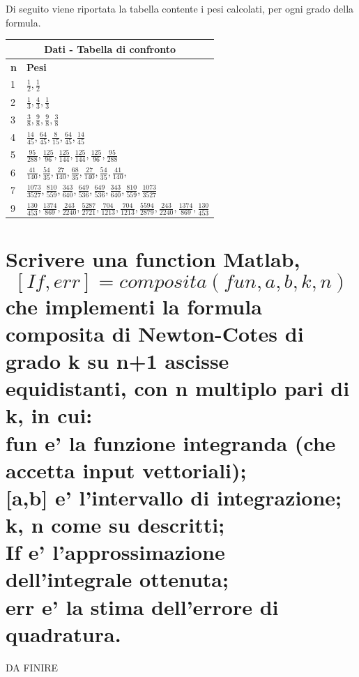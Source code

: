 \documentclass[10pt,a4paper]{article}
\begin{document}
Di seguito viene riportata la tabella contente i pesi calcolati, per ogni grado della formula.
\\
\begin{center}
  \begin{spacing}{1.5}
  \begin{longtable}{ |p{0.2cm}|p{8cm}| }
    \hline
    \multicolumn{2}{|c|}{ \textbf{Dati - Tabella di confronto}} \\
    \hline
    \textbf{n}     & \textbf{Pesi} \\
    \hline
    1 & $ \frac{1}{2}, \frac{1}{2} $ \\
    2 & $ \frac{1}{3}, \frac{4}{3}, \frac{1}{3} $ \\
    3 & $ \frac{3}{8}, \frac{9}{8}, \frac{9}{8}, \frac{3}{8} $ \\
    4 & $ \frac{14}{45}, \frac{64}{45}, \frac{8}{15}, \frac{64}{45}, \frac{14}{45} $ \\
    5 & $ \frac{95}{288}, \frac{125}{96}, \frac{125}{144}, \frac{125}{144}, \frac{125}{96}, \frac{95}{288} $ \\
    6 & $ \frac{41}{140}, \frac{54}{35}, \frac{27}{140}, \frac{68}{35}, \frac{27}{140}, \frac{54}{35}, \frac{41}{140}, $ \\
    7 & $ \frac{1073}{3527}, \frac{810}{559}, \frac{343}{640}, \frac{649}{536}, \frac{649}{536}, \frac{343}{640}, \frac{810}{559}, \frac{1073}{3527} $ \\
    9 & $ \frac{130}{453}, \frac{1374}{869}, \frac{243}{2240}, \frac{5287}{2721}, \frac{704}{1213}, \frac{704}{1213}, \frac{5594}{2879}, \frac{243}{2240}, \frac{1374}{869}, \frac{130}{453} $ \\
    \hline
  \end{longtable}
\end{spacing}
\end{center}

\section{
  Scrivere una function Matlab,
  $$ [If,err] = composita( fun, a, b, k, n ) $$
  che implementi la formula composita di Newton-Cotes di grado \textbf{k} su \textbf{n+1} ascisse equidistanti, con \textbf{n}
  multiplo pari di \textbf{k}, in cui:
  \\
  \textbullet \textbf{fun} e' la funzione integranda (che accetta input vettoriali);
  \\
  \textbullet \textbf{[a,b]} e' l'intervallo di integrazione;
  \\
  \textbullet \textbf{k, n} come su descritti;
  \\
  \textbullet \textbf{If} e' l'approssimazione dell'integrale ottenuta;
  \\
  \textbullet \textbf{err} e' la stima dell'errore di quadratura.
 }
DA FINIRE
\end{document}
